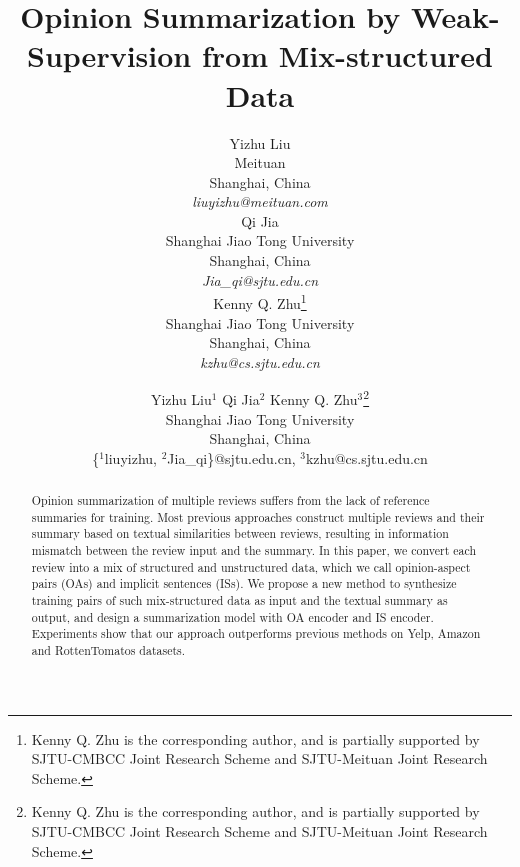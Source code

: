 \documentclass[11pt]{article}
\title{Opinion Summarization by Weak-Supervision from Mix-structured Data}
\author{Yizhu Liu\\
	Meituan \\
	Shanghai, China \\
	\textit{liuyizhu@meituan.com} \\\And
	Qi Jia\\
	Shanghai Jiao Tong University\\
	Shanghai, China\\
	\textit{Jia\_qi@sjtu.edu.cn}\\\And
	Kenny Q. Zhu\thanks{Kenny Q. Zhu is the corresponding author, and is partially supported by SJTU-CMBCC Joint Research Scheme and SJTU-Meituan Joint Research Scheme.}\\
	Shanghai Jiao Tong University\\
	Shanghai, China\\
	\textit{kzhu@cs.sjtu.edu.cn}\\}
\author{Yizhu Liu$^1$ \hspace*{1cm} Qi Jia$^2$ \hspace*{1cm} Kenny Q. Zhu$^3$\thanks{Kenny Q. Zhu is the corresponding author, and is partially supported by SJTU-CMBCC Joint Research Scheme and SJTU-Meituan Joint Research Scheme.}\\
	Shanghai Jiao Tong University \\ Shanghai, China \\
	\{$^1$liuyizhu, $^2$Jia\_qi\}@sjtu.edu.cn,
	$^3$kzhu@cs.sjtu.edu.cn}
\begin{document}
\maketitle


\begin{abstract}
Opinion summarization of multiple reviews suffers from the lack 
of reference summaries for training.
Most previous approaches construct multiple reviews and their summary 
based on textual similarities between reviews,
resulting in information mismatch between the review input and the summary. 
In this paper, we convert each review into a mix
of structured and unstructured data, 
which we call opinion-aspect pairs (OAs) and implicit sentences (ISs).
We propose a new method to synthesize training pairs 
of such mix-structured data as input and the textual summary as output,
and design a summarization model with OA encoder and IS encoder.
Experiments show that our approach outperforms previous 
methods on Yelp, Amazon and RottenTomatos datasets.
\end{abstract}




 







\end{document}
